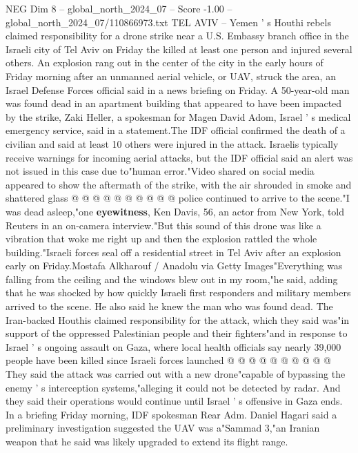 \begin{textsample}{NEG Dim 8 – global\_north\_2024\_07 – Score -1.00 – global\_north\_2024\_07/110866973.txt}  \label{ex:f8_neg_413}
TEL AVIV -- Yemen ' s Houthi rebels claimed responsibility for a drone strike near a U.S.
Embassy branch office in the Israeli city of Tel Aviv on Friday the killed at least one person and injured several others.
An explosion rang out in the center of the city in the early hours of Friday morning after an unmanned aerial vehicle, or UAV, struck the area, an Israel Defense Forces official said in a news briefing on Friday.
A 50-year-old man was found dead in an apartment building that appeared to have been impacted by the strike, Zaki Heller, a spokesman for Magen David Adom, Israel ' s medical emergency service, said in a statement.The IDF official confirmed the death of a civilian and said at least 10 others were injured in the attack.
Israelis typically receive warnings for incoming aerial attacks, but the IDF official said an alert was not issued in this case due to"human error."Video shared on social media appeared to show the aftermath of the strike, with the air shrouded in smoke and shattered glass @ @ @ @ @ @ @ @ @ @ police continued to arrive to the scene."I was dead asleep,"one \textbf{eyewitness}, Ken Davis, 56, an actor from New York, told Reuters in an on-camera interview."But this sound of this drone was like a vibration that woke me right up and then the explosion rattled the whole building."Israeli forces seal off a residential street in Tel Aviv after an explosion early on Friday.Mostafa Alkharouf / Anadolu via Getty Images"Everything was falling from the ceiling and the windows blew out in my room,"he said, adding that he was shocked by how quickly Israeli first responders and military members arrived to the scene.
He also said he knew the man who was found dead.
The Iran-backed Houthis claimed responsibility for the attack, which they said was"in support of the oppressed Palestinian people and their fighters"and in response to Israel ' s ongoing assault on Gaza, where local health officials say nearly 39,000 people have been killed since Israeli forces launched @ @ @ @ @ @ @ @ @ @ They said the attack was carried out with a new drone"capable of bypassing the enemy ' s interception systems,"alleging it could not be detected by radar.
And they said their operations would continue until Israel ' s offensive in Gaza ends.
In a briefing Friday morning, IDF spokesman Rear Adm.
Daniel Hagari said a preliminary investigation suggested the UAV was a"Sammad 3,"an Iranian weapon that he said was likely upgraded to extend its flight range.

\end{textsample}
